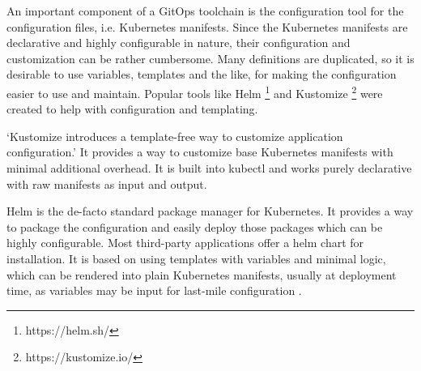 


An important component of a GitOps toolchain is the configuration tool
for the configuration files, i.e. Kubernetes manifests.
Since the Kubernetes manifests are declarative and highly configurable in nature,
their configuration and customization can be rather cumbersome.
Many definitions are duplicated, so it is desirable to use variables, templates and the like,
for making the configuration easier to use and maintain.
Popular tools like Helm \footnote{https://helm.sh/} and Kustomize \footnote{https://kustomize.io/} were created to help with configuration and templating.

\enquote*{Kustomize introduces a template-free way to customize application configuration.}
\autocite{kustomizeIoWebsite}
It provides a way to customize base Kubernetes manifests with minimal additional overhead.
It is built into kubectl and works purely declarative with raw manifests as input and output.

Helm is the de-facto standard package manager for Kubernetes.
It provides a way to package the configuration and easily deploy those packages
which can be highly configurable.
Most third-party applications offer a helm chart for installation.
It is based on using templates with variables and minimal logic,
which can be rendered into plain Kubernetes manifests, usually at deployment time,
as variables may be input for last-mile configuration
\autocite{helmWebsite}.

%









